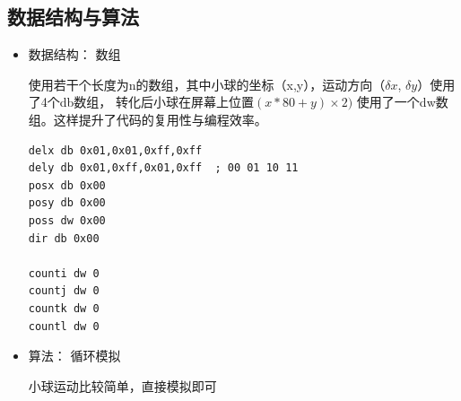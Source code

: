 \documentclass[a4paper,11pt,UTF8]{ctexart}
\begin{document}
\subsection{数据结构与算法}

	\begin{itemize}
		\item 数据结构： 数组
		
		使用若干个长度为n的数组，其中小球的坐标（x,y），运动方向（$\delta x$, $\delta y$）使用了4个db数组， 转化后小球在屏幕上位置$(x*80+y)\times 2)$ 使用了一个dw数组。这样提升了代码的复用性与编程效率。
			
			
			\clearpage
			\begin{lstlisting}[caption={stone\_v0.asm数组定义},basicstyle=\footnotesize,tabsize=4,captionpos=b]
delx db 0x01,0x01,0xff,0xff
dely db 0x01,0xff,0x01,0xff  ; 00 01 10 11
posx db 0x00
posy db 0x00
poss dw 0x00
dir db 0x00

counti dw 0
countj dw 0
countk dw 0
countl dw 0
			\end{lstlisting}
			
		\item 算法： 循环模拟
		
		小球运动比较简单，直接模拟即可
		
	\end{itemize}
\end{document}
